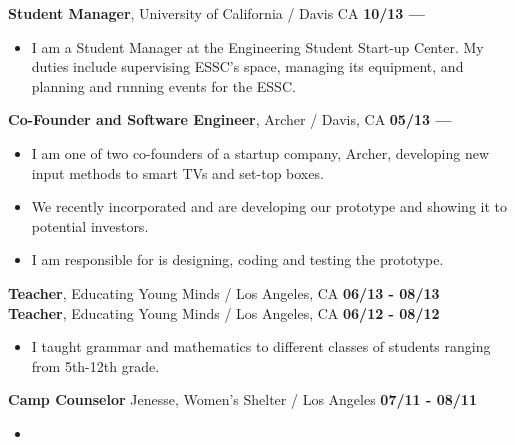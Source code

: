 \documentclass[line, margin, 10pt]{res} %
\begin{document}
\begin{resume}
{\bf Student Manager}, University of California / Davis CA
\hfill {\bf 10/13 ---}
\begin{itemize}[noitemsep,nolistsep] \itemsep -2pt %
    \item I am a Student Manager at the Engineering Student Start-up Center. My duties include supervising ESSC's space, managing its equipment, and planning and running events for the ESSC.
\end{itemize}

{\bf Co-Founder and Software Engineer}, Archer / Davis, CA
\hfill {\bf 05/13 ---}
\begin{itemize}[noitemsep,nolistsep] \itemsep -2pt %
    \item I am one of two co-founders of a startup company, Archer, developing new input methods to smart TVs and set-top boxes.
    \item We recently incorporated and are developing our prototype and showing it to potential investors.
    \item I am responsible for is designing, coding and testing the prototype.
\end{itemize}

{\bf Teacher}, Educating Young Minds / Los Angeles, CA
\hfill {\bf 06/13 - 08/13} \\
{\bf Teacher}, Educating Young Minds / Los Angeles, CA
\hfill {\bf 06/12 - 08/12}
\begin{itemize}[noitemsep,nolistsep] \itemsep -2pt %
\item
I taught grammar and mathematics to different classes of students ranging from 5th-12th grade.
\end{itemize}

{\bf Camp Counselor} Jenesse, Women's Shelter / Los Angeles
\hfill {\bf 07/11 - 08/11}
\begin{itemize}[noitemsep,nolistsep] \itemsep -2pt %
\item 
\end{itemize}





\end{resume}
\end{document}
